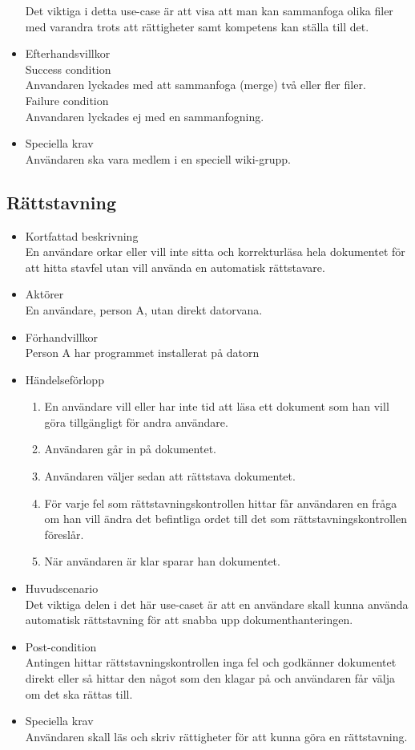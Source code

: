 \begin{itemize}
	Det viktiga i detta use-case är att visa att man kan sammanfoga olika filer med varandra trots att rättigheter samt kompetens kan ställa till det.
	\item Efterhandsvillkor	
		\\Success condition 
		\\Anvandaren lyckades med att sammanfoga (merge) två eller fler filer.
		\\Failure condition
		\\Anvandaren lyckades ej med en sammanfogning.
		
	\item Speciella krav
	\\Användaren ska vara medlem i en speciell wiki-grupp.
\end{itemize}

\subsection{Rättstavning}
\begin{itemize}
	\item Kortfattad beskrivning
	\\En användare orkar eller vill inte sitta och korrekturläsa hela dokumentet för att hitta stavfel utan vill använda en automatisk rättstavare.
	\item Aktörer
	\\En användare, person A, utan direkt datorvana.
	\item Förhandvillkor
	\\Person A har programmet installerat på datorn
	\item Händelseförlopp
	\begin{enumerate}
		\item En användare vill eller har inte tid att läsa ett dokument som han vill göra tillgängligt för andra användare.
		\item Användaren går in på dokumentet.
		\item Användaren väljer sedan att rättstava dokumentet.
		\item För varje fel som rättstavningskontrollen hittar får användaren en fråga om han vill ändra det befintliga ordet till det som rättstavningskontrollen föreslår.
		\item När användaren är klar sparar han dokumentet.
	\end{enumerate}
	\item Huvudscenario
	\\Det viktiga delen i det här use-caset är att en användare skall kunna använda automatisk rättstavning för att snabba upp dokumenthanteringen.
	\item Post-condition
	\\ Antingen hittar rättstavningskontrollen inga fel och godkänner dokumentet direkt eller så hittar den något som den klagar på och användaren får välja om det ska rättas till.
	\item Speciella krav
	\\Användaren skall läs och skriv rättigheter för att kunna göra en rättstavning.
\end{itemize}

